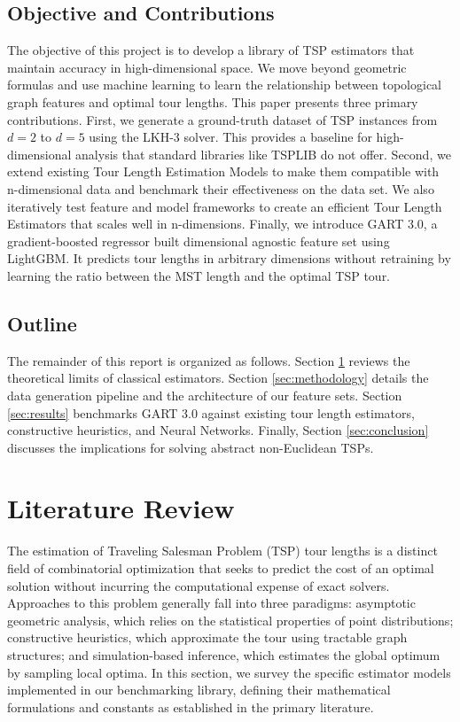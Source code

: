 \documentclass{article}
\begin{document}
\subsection{Objective and Contributions}

The objective of this project is to develop a library of TSP estimators that maintain accuracy in high-dimensional space. We move beyond geometric formulas and use machine learning to learn the relationship between topological graph features and optimal tour lengths. This paper presents three primary contributions. First, we generate a ground-truth dataset of TSP instances from $d=2$ to $d=5$ using the LKH-3 solver. This provides a baseline for high-dimensional analysis that standard libraries like TSPLIB do not offer.  Second, we extend existing Tour Length Estimation Models to make them compatible with n-dimensional data and benchmark their effectiveness on the data set. We also iteratively test feature and model frameworks to create an efficient Tour Length Estimators that scales well in n-dimensions. Finally, we introduce GART 3.0, a gradient-boosted regressor built dimensional agnostic feature set using LightGBM. It predicts tour lengths in arbitrary dimensions without retraining by learning the ratio between the MST length and the optimal TSP tour.

\subsection{Outline}

The remainder of this report is organized as follows. Section \ref{sec:lit_review} reviews the theoretical limits of classical estimators. Section \ref{sec:methodology} details the data generation pipeline and the architecture of our feature sets. Section \ref{sec:results} benchmarks GART 3.0 against existing tour length estimators, constructive heuristics, and Neural Networks. Finally, Section \ref{sec:conclusion} discusses the implications for solving abstract non-Euclidean TSPs.

\section{Literature Review}
\label{sec:lit_review}

The estimation of Traveling Salesman Problem (TSP) tour lengths is a distinct field of combinatorial optimization that seeks to predict the cost of an optimal solution without incurring the computational expense of exact solvers. Approaches to this problem generally fall into three paradigms: asymptotic geometric analysis, which relies on the statistical properties of point distributions; constructive heuristics, which approximate the tour using tractable graph structures; and simulation-based inference, which estimates the global optimum by sampling local optima. In this section, we survey the specific estimator models implemented in our benchmarking library, defining their mathematical formulations and constants as established in the primary literature.
\end{document}
